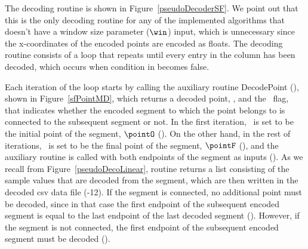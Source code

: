 \vspace{+5pt}



\clearpage




\vspace{-5pt}


The decoding routine is shown in Figure~\ref{pseudoDecoderSF}. We point out that this is the only decoding routine for any of the implemented algorithms that doesn't have a window size parameter ($\win$) input, which is unnecessary since the x-coordinates of the encoded points are encoded as floats. The decoding routine consists of a loop that repeats until every entry in the column has been decoded, which occurs when condition in  becomes false. 





Each iteration of the loop starts by calling the auxiliary routine DecodePoint (), shown in Figure~\ref{sfPointMD}, which returns a decoded point, \pointP, and the \connected\ flag, that indicates whether the encoded segment to which the point belongs to is connected to the subsequent segment or not.  In the first iteration, \pointP\ is set to be the initial point of the segment, $\pointO$ (). On the other hand, in the rest of iterations, \pointP\ is set to be the final point of the segment, $\pointF$ (), and the auxiliary routine \decodeSegment is called with both endpoints of the segment as inputs (). As we recall from Figure~\ref{pseudoDecoLinear}, routine \decodeSegment returns a list consisting of the sample values that are decoded from the segment, which are then written in the decoded csv data file (-12). If the segment is connected, no additional point must be decoded, since in that case the first endpoint of the subsequent encoded segment is equal to the last endpoint of the last decoded segment (). However, if the segment is not connected, the first endpoint of the subsequent encoded segment must be decoded ().


\vspace{-3pt}


        


